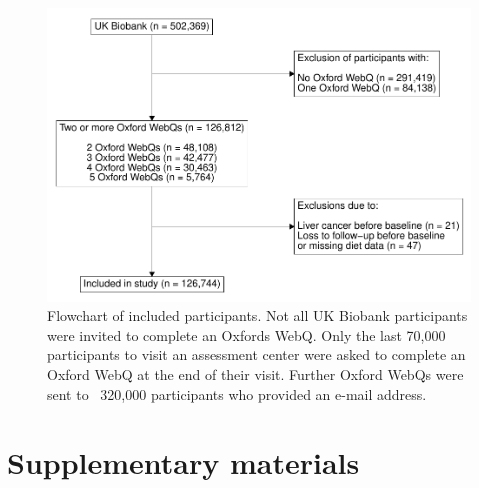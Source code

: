 \documentclass[
]{article}
\begin{document}
\begin{figure}[h]

{\centering \includegraphics[width=0.75\linewidth,]{report_files/figure-latex/fig1-1} 

}

\caption{Flowchart of included participants. Not all UK Biobank participants were invited to complete an Oxfords WebQ. Only the last 70,000 participants to visit an assessment center were asked to complete an Oxford WebQ at the end of their visit. Further Oxford WebQs were sent to ~320,000 participants who provided an e-mail address.}\label{fig:fig1}
\end{figure}

\clearpage

\renewcommand{\thetable}{S\arabic{table}}
\renewcommand{\thefigure}{S\arabic{figure}}
\setcounter{table}{0}
\setcounter{figure}{0}

\hypertarget{sec9}{%
\section{Supplementary materials}\label{sec9}}
\end{document}
